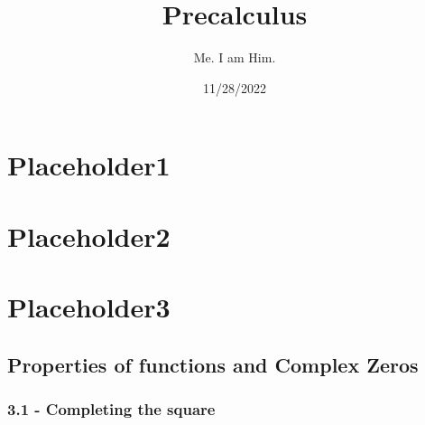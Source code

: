 \documentclass{report}
\title{\Huge{Precalculus}}
\author{Me. I am Him.}
\date{11/28/2022}
\begin{document}
\maketitle
\newpage
{}
\tableofcontents
\pagebreak

\thispagestyle{empty}
\newpage
\listoffigures
\clearpage
{}
\pagebreak


\chapter{Placeholder1}

\chapter{Placeholder2}

\chapter{Placeholder3}
\section{Properties of functions and Complex Zeros}

\subsection{3.1 - Completing the square}
\end{document}
